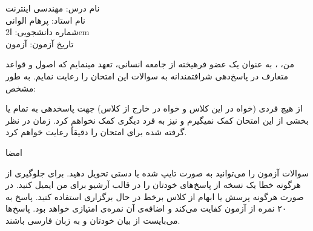 نام درس:‌ مهندسی اینترنت\\
نام استاد:‌ پرهام الوانی\\
شماره دانشجویی:‌ ‌ا{2em}\\
تاریخ آزمون: ‌آزمون

من، ، به عنوان یک عضو فرهیخته از جامعه انسانی،
تعهد مینمایم که اصول و قواعد متعارف در پاسخ‌دهی
شرافتمندانه به سوالات این امتحان را رعایت نمایم. به طور مشخص:

     از هیچ فردی (خواه در این کلاس و خواه در خارج از کلاس) جهت پاسخدهی به تمام یا بخشی از
    این امتحان کمک نمیگیرم و نیز به فرد دیگری کمک نخواهم کرد.
     زمان در نظر گرفته شده برای امتحان را دقیقاً رعایت خواهم کرد.

امضا

     سوالات آزمون را می‌توانید به صورت تایپ شده یا دستی تحویل دهید.
     برای جلوگیری از هرگونه خطا یک نسخه از پاسخ‌های خودتان را در قالب آرشیو برای من ایمیل کنید.
     در صورت هرگونه پرسش یا ابهام از کلاس برخط در حال برگزاری استفاده کنید.
     پاسخ به ۲۰ نمره از آزمون کفایت می‌کند و اضافه‌ی آن نمره‌ی امتیازی خواهد بود.
     پاسخ‌ها می‌بایست از بیان خودتان و به زبان فارسی باشند.
